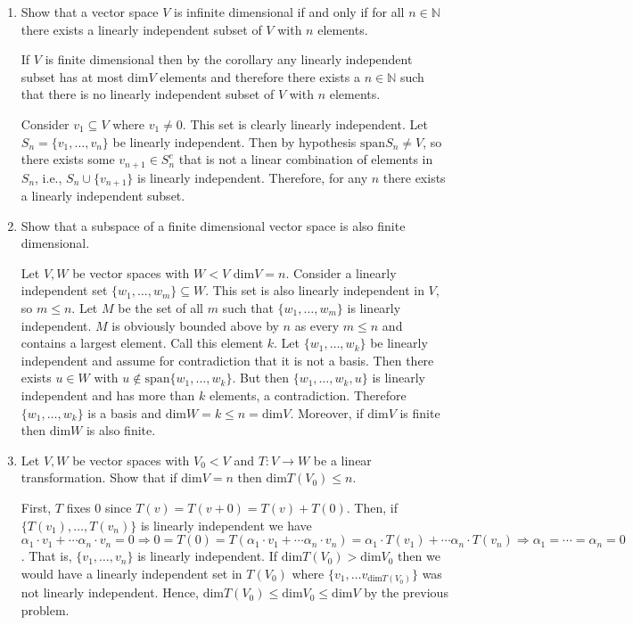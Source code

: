 \documentclass[12pt]{article}
\begin{document}
\begin{enumerate}
\begin{enumerate}
\end{enumerate}

\item Show that a vector space $V$ is infinite dimensional if and only if for all $n \in \mathbb{N}$ there exists a linearly independent subset of $V$ with $n$ elements.

If $V$ is finite dimensional then by the corollary any linearly independent subset has at most $\mathrm{dim}V$ elements and therefore there exists a $n \in \mathbb{N}$ such that there is no linearly independent subset of $V$ with $n$ elements.

Consider ${v_1} \subseteq V$ where $v_1 \neq 0$.  This set is clearly linearly independent.  Let $S_n = \{v_1, \ldots, v_n\}$ be linearly independent.  Then by hypothesis $\mathrm{span} S_n \neq V$, so there exists some $v_{n+1} \in S_n^c$ that is not a linear combination of elements in $S_n$, i.e., $S_n \cup \{v_{n+1}\}$ is linearly independent.  Therefore, for any $n$ there exists a linearly independent subset.

\item Show that a subspace of a finite dimensional vector space is also finite dimensional.

Let $V,W$ be vector spaces with $W < V$ $\mathrm{dim} V = n$.  Consider a linearly independent set $\{w_1,\ldots,w_m\} \subseteq W$.  This set is also linearly independent in $V$, so $m \leq n$.  Let $M$ be the set of all $m$ such that $\{w_1,\ldots,w_m\}$ is linearly independent.  $M$ is obviously bounded above by $n$ as every $m \leq n$ and contains a largest element.  Call this element $k$.  Let $\{w_1,\ldots,w_k\}$ be linearly independent and assume for contradiction that it is not a basis.  Then there exists $u \in W$ with $u \notin \mathrm{span} \{w_1,\ldots,w_k\}$.  But then $\{w_1,\ldots,w_k,u\}$ is linearly independent and has more than $k$ elements, a contradiction.  Therefore $\{w_1,\ldots,w_k\}$ is a basis and $\mathrm{dim} W = k \leq n = \mathrm{dim} V$.  Moreover, if $\mathrm{dim} V$ is finite then $\mathrm{dim} W$ is also finite.

\item Let $V,W$ be vector spaces with $V_0 < V$ and $T: V \rightarrow W$ be a linear transformation.  Show that if $\mathrm{dim} V = n$ then $\mathrm{dim} T(V_0) \leq n$.

First, $T$ fixes 0 since $T(v) = T(v+0) = T(v) + T(0)$.  Then, if $\{T(v_1),\ldots,T(v_n)\}$ is linearly independent we have $\alpha_1 \cdot v_1 + \cdots \alpha_n \cdot v_n = 0 \Rightarrow 0 = T(0) = T(\alpha_1 \cdot v_1 + \cdots \alpha_n \cdot v_n) = \alpha_1 \cdot T(v_1) + \cdots \alpha_n \cdot T(v_n) \Rightarrow \alpha_1 = \cdots = \alpha_n = 0$.  That is, $\{v_1,\ldots,v_n\}$ is linearly independent.  If $\mathrm{dim} T(V_0) > \mathrm{dim} V_0$ then we would have a linearly independent set in $T(V_0)$ where  $\{v_1, \ldots v_{\mathrm{dim} T(V_0)}\}$ was not linearly independent.  Hence, $ \mathrm{dim} T(V_0) \leq \mathrm{dim} V_0 \leq \mathrm{dim} V$ by the previous problem.



\end{enumerate}
\end{document}
